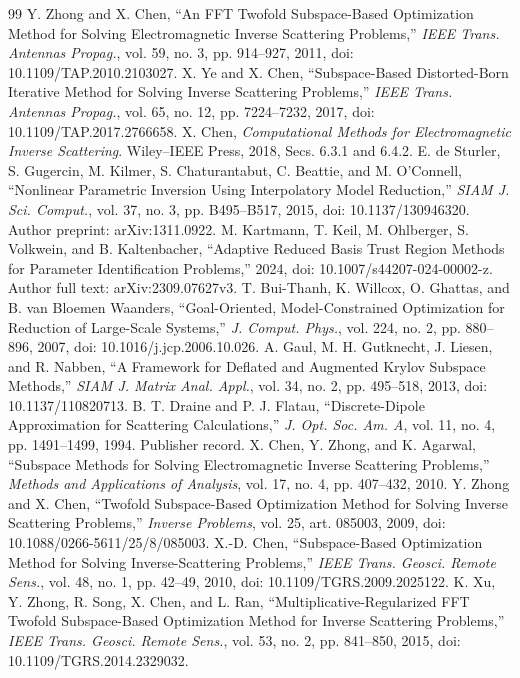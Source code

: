 \begin{thebibliography}{99}
 Y. Zhong and X. Chen, ``An FFT Twofold Subspace-Based Optimization Method for Solving Electromagnetic Inverse Scattering Problems,'' \emph{IEEE Trans. Antennas Propag.}, vol. 59, no. 3, pp. 914--927, 2011, doi: 10.1109/TAP.2010.2103027.
 X. Ye and X. Chen, ``Subspace-Based Distorted-Born Iterative Method for Solving Inverse Scattering Problems,'' \emph{IEEE Trans. Antennas Propag.}, vol. 65, no. 12, pp. 7224--7232, 2017, doi: 10.1109/TAP.2017.2766658.
 X. Chen, \emph{Computational Methods for Electromagnetic Inverse Scattering}. Wiley--IEEE Press, 2018, Secs. 6.3.1 and 6.4.2.
 E. de Sturler, S. Gugercin, M. Kilmer, S. Chaturantabut, C. Beattie, and M. O'Connell, ``Nonlinear Parametric Inversion Using Interpolatory Model Reduction,'' \emph{SIAM J. Sci. Comput.}, vol. 37, no. 3, pp. B495--B517, 2015, doi: 10.1137/130946320. Author preprint: arXiv:1311.0922.
 M. Kartmann, T. Keil, M. Ohlberger, S. Volkwein, and B. Kaltenbacher, ``Adaptive Reduced Basis Trust Region Methods for Parameter Identification Problems,'' 2024, doi: 10.1007/s44207-024-00002-z. Author full text: arXiv:2309.07627v3.
 T. Bui-Thanh, K. Willcox, O. Ghattas, and B. van Bloemen Waanders, ``Goal-Oriented, Model-Constrained Optimization for Reduction of Large-Scale Systems,'' \emph{J. Comput. Phys.}, vol. 224, no. 2, pp. 880--896, 2007, doi: 10.1016/j.jcp.2006.10.026.
 A. Gaul, M. H. Gutknecht, J. Liesen, and R. Nabben, ``A Framework for Deflated and Augmented Krylov Subspace Methods,'' \emph{SIAM J. Matrix Anal. Appl.}, vol. 34, no. 2, pp. 495--518, 2013, doi: 10.1137/110820713.
 B. T. Draine and P. J. Flatau, ``Discrete-Dipole Approximation for Scattering Calculations,'' \emph{J. Opt. Soc. Am. A}, vol. 11, no. 4, pp. 1491--1499, 1994. Publisher record.
 X. Chen, Y. Zhong, and K. Agarwal, ``Subspace Methods for Solving Electromagnetic Inverse Scattering Problems,'' \emph{Methods and Applications of Analysis}, vol. 17, no. 4, pp. 407--432, 2010.
 Y. Zhong and X. Chen, ``Twofold Subspace-Based Optimization Method for Solving Inverse Scattering Problems,'' \emph{Inverse Problems}, vol. 25, art. 085003, 2009, doi: 10.1088/0266-5611/25/8/085003.
 X.-D. Chen, ``Subspace-Based Optimization Method for Solving Inverse-Scattering Problems,'' \emph{IEEE Trans. Geosci. Remote Sens.}, vol. 48, no. 1, pp. 42--49, 2010, doi: 10.1109/TGRS.2009.2025122.
 K. Xu, Y. Zhong, R. Song, X. Chen, and L. Ran, ``Multiplicative-Regularized FFT Twofold Subspace-Based Optimization Method for Inverse Scattering Problems,'' \emph{IEEE Trans. Geosci. Remote Sens.}, vol. 53, no. 2, pp. 841--850, 2015, doi: 10.1109/TGRS.2014.2329032.
\end{thebibliography}
